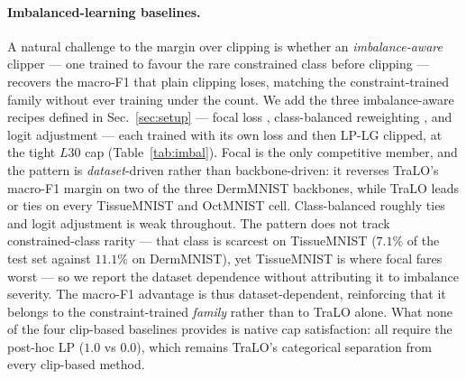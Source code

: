 \documentclass[10pt]{article}
\begin{document}
{\color{blue}
\paragraph{Imbalanced-learning baselines.}
A natural challenge to the margin over clipping is whether an \emph{imbalance-aware}
clipper --- one trained to favour the rare constrained class before clipping ---
recovers the macro-F1 that plain clipping loses, matching the constraint-trained
family without ever training under the count. We add the three imbalance-aware recipes
defined in Sec.~\ref{sec:setup} --- focal loss \citep{lin2017focal}, class-balanced
reweighting \citep{cui2019class}, and logit adjustment \citep{menon2020long} --- each
trained with its own loss and then LP-LG clipped, at the tight $L30$ cap
(Table~\ref{tab:imbal}). Focal is the only competitive member, and the pattern is
\emph{dataset}-driven rather than backbone-driven: it reverses TraLO's macro-F1 margin on
two of the three DermMNIST backbones, while TraLO leads or ties on every TissueMNIST and
OctMNIST cell. Class-balanced roughly ties and logit adjustment is weak throughout. The
pattern does not track constrained-class rarity --- that class is scarcest on TissueMNIST
($7.1\%$ of the test set against $11.1\%$ on DermMNIST), yet TissueMNIST is where focal
fares worst --- so we report the dataset dependence without attributing it to imbalance
severity. The macro-F1 advantage is thus dataset-dependent, reinforcing that it belongs to
the constraint-trained \emph{family} rather than to TraLO alone. What none of the four clip-based baselines provides is
native cap satisfaction: all require the post-hoc LP ($1.0$ vs $0.0$), which remains
TraLO's categorical separation from every clip-based method.}
\end{document}
